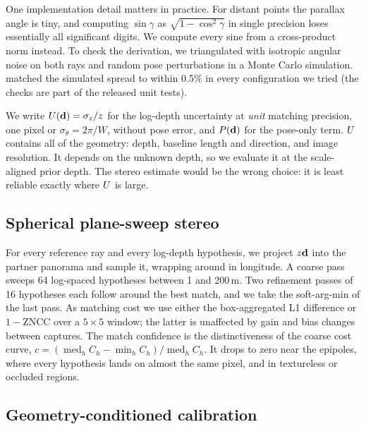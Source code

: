 One implementation detail matters in practice. For distant points the parallax angle is tiny, and
computing $\sin\gamma$ as $\sqrt{1-\cos^2\gamma}$ in single precision loses essentially all
significant digits. We compute every sine from a cross-product norm instead. To check the derivation,
we triangulated with isotropic angular noise on both rays and random pose perturbations in a Monte
Carlo simulation.  matched the simulated spread to within 0.5\% in every
configuration we tried (the checks are part of the released unit tests).

We write $U(\mathbf{d})=\sigma_z/z$ for the log-depth uncertainty at \emph{unit} matching precision, one
pixel or $\sigma_\theta=2\pi/W$, without pose error, and $P(\mathbf{d})$ for the pose-only term. $U$
contains all of the geometry: depth, baseline length and direction, and image resolution. It depends
on the unknown depth, so we evaluate it at the scale-aligned prior depth. The stereo estimate would be
the wrong choice: it is least reliable exactly where $U$ is large.

\subsection{Spherical plane-sweep stereo}
\label{sec:stereo}

For every reference ray and every log-depth hypothesis, we project $z\mathbf{d}$ into the partner panorama
and sample it, wrapping around in longitude. A coarse pass sweeps 64 log-spaced hypotheses between 1
and 200\,m. Two refinement passes of 16 hypotheses each follow around the best match, and we take the
soft-arg-min of the last pass. As matching cost we use either the box-aggregated L1 difference or
$1-$ZNCC over a $5\times5$ window; the latter is unaffected by gain and bias changes between captures.
The match confidence is the distinctiveness of the coarse cost curve,
$c=(\operatorname{med}_h C_h-\min_h C_h)/\operatorname{med}_h C_h$. It drops to zero near the epipoles,
where every hypothesis lands on almost the same pixel, and in textureless or occluded regions.

\subsection{Geometry-conditioned calibration}
\label{sec:calibration}

